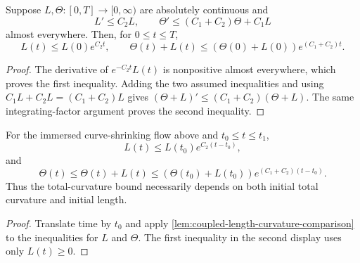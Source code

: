 \begin{lemma}
\label{lem:coupled-length-curvature-comparison}
\notready
Suppose $L,\Theta\colon[0,T]\to[0,\infty)$ are absolutely continuous and
\[
 L'\le C_2L,\qquad
 \Theta'\le(C_1+C_2)\Theta+C_1L
\]
almost everywhere.  Then, for $0\le t\le T$,
\[
 L(t)\le L(0)e^{C_2t},\qquad
 \Theta(t)+L(t)\le(\Theta(0)+L(0))e^{(C_1+C_2)t}.
\]
\end{lemma}
\begin{proof}
The derivative of $e^{-C_2t}L(t)$ is nonpositive almost everywhere, which
proves the first inequality.  Adding the two assumed inequalities and using
$C_1L+C_2L=(C_1+C_2)L$ gives
$(\Theta+L)'\le(C_1+C_2)(\Theta+L)$.  The same integrating-factor
argument proves the second inequality.
\end{proof}

\begin{theorem}
\label{thm:curve-flow-length-total-curvature-bounds}
\notready
For the immersed curve-shrinking flow above and $t_0\le t\le t_1$,
\[
 L(t)\le L(t_0)e^{C_2(t-t_0)},
\]
and
\[
 \Theta(t)\le\Theta(t)+L(t)
 \le(\Theta(t_0)+L(t_0))e^{(C_1+C_2)(t-t_0)}.
\]
Thus the total-curvature bound necessarily depends on both initial
total curvature and initial length.
\end{theorem}
\begin{proof}
Translate time by $t_0$ and apply
\ref{lem:coupled-length-curvature-comparison} to the inequalities for $L$ and
$\Theta$.  The first inequality in the second display uses only $L(t)\ge0$.
\end{proof}

